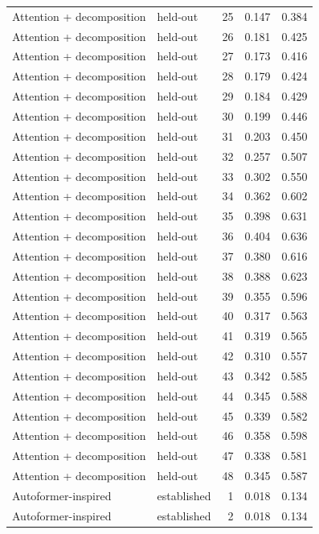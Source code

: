 \begin{tabular}{llrrr}
Attention + decomposition & held-out & 25 & 0.147 & 0.384 \\
Attention + decomposition & held-out & 26 & 0.181 & 0.425 \\
Attention + decomposition & held-out & 27 & 0.173 & 0.416 \\
Attention + decomposition & held-out & 28 & 0.179 & 0.424 \\
Attention + decomposition & held-out & 29 & 0.184 & 0.429 \\
Attention + decomposition & held-out & 30 & 0.199 & 0.446 \\
Attention + decomposition & held-out & 31 & 0.203 & 0.450 \\
Attention + decomposition & held-out & 32 & 0.257 & 0.507 \\
Attention + decomposition & held-out & 33 & 0.302 & 0.550 \\
Attention + decomposition & held-out & 34 & 0.362 & 0.602 \\
Attention + decomposition & held-out & 35 & 0.398 & 0.631 \\
Attention + decomposition & held-out & 36 & 0.404 & 0.636 \\
Attention + decomposition & held-out & 37 & 0.380 & 0.616 \\
Attention + decomposition & held-out & 38 & 0.388 & 0.623 \\
Attention + decomposition & held-out & 39 & 0.355 & 0.596 \\
Attention + decomposition & held-out & 40 & 0.317 & 0.563 \\
Attention + decomposition & held-out & 41 & 0.319 & 0.565 \\
Attention + decomposition & held-out & 42 & 0.310 & 0.557 \\
Attention + decomposition & held-out & 43 & 0.342 & 0.585 \\
Attention + decomposition & held-out & 44 & 0.345 & 0.588 \\
Attention + decomposition & held-out & 45 & 0.339 & 0.582 \\
Attention + decomposition & held-out & 46 & 0.358 & 0.598 \\
Attention + decomposition & held-out & 47 & 0.338 & 0.581 \\
Attention + decomposition & held-out & 48 & 0.345 & 0.587 \\
Autoformer-inspired & established & 1 & 0.018 & 0.134 \\
Autoformer-inspired & established & 2 & 0.018 & 0.134 \\

\end{tabular}
